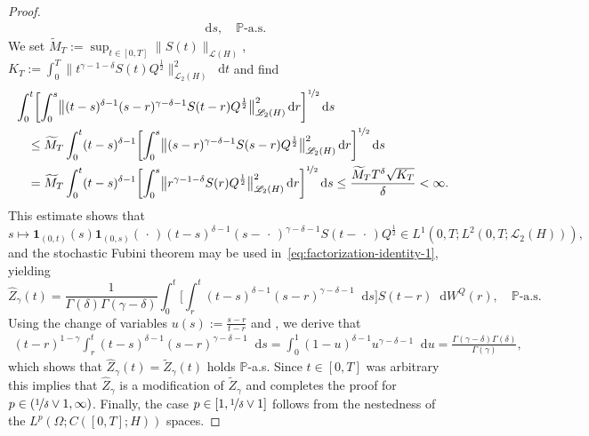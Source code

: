 \documentclass[reqno]{amsart}
\numberwithin{equation}{section}
\newcommand{\bbP}{\mathbb{P}}
\newcommand{\norm}[2]{     \| #1       \|_{ #2 }}
\newcommand{\rd}{\mathop{}\!\mathrm{d}}
\theoremstyle{remark}
\theoremstyle{definition}
\begin{document}
\begin{proof}
\begin{align}
	\rd s , 
	\quad 
	\bbP\text{-a.s.} 
	\label{eq:factorization-identity-1}
	\end{align}
	We set   
	$\widetilde M_T := \sup_{t\in[0,T]} \norm{S(t)}{\mathscr L(H)}$,  
	$K_T := \int_0^T 
	\bigl\| t^{\gamma-1-\delta} S(t) Q^{ \frac{1}{2} } \bigr\|_{\mathscr L_2(H)}^2 
	\rd t$
	and find 
	\begin{align*}
	&\int_0^t 
	\biggl[
	\int_0^s
	\bigl\| 
	(t-s)^{\delta-1} 
	(s-r)^{\gamma-\delta-1} S(t-r)Q^{\frac{1}{2}}
	\bigr\|_{\mathscr L_2(H)}^2
	\rd r
	\biggr]^{\nicefrac{1}{2}}
	\rd s 
	\\
	&\quad \leq 
	\widetilde M_T
	\int_0^t 
	(t-s)^{\delta-1}
	\biggl[
	\int_0^s
	\bigl\| 
	(s-r)^{\gamma-\delta-1} S(s-r)Q^{\frac{1}{2}}
	\bigr\|_{\mathscr L_2(H)}^2
	\rd r
	\biggr]^{\nicefrac{1}{2}}
	\rd s 
	\\
	&\quad
	=
	\widetilde M_T
	\int_0^t 
	(t-s)^{\delta-1}
	\biggl[
	\int_0^s
	\bigl\| 
	r^{\gamma-1-\delta} S(r)Q^{\frac{1}{2}}
	\bigr\|_{\mathscr L_2(H)}^2
	\rd r
	\biggr]^{\nicefrac{1}{2}}
	\rd s
	\leq 
	\frac{\widetilde M_T T^\delta \sqrt{ K_T } }{ \delta } < \infty.
	\end{align*}
	This estimate shows that 
	\[
	s\mapsto 
	\mathbf 1_{(0,t)}(s)
	\mathbf 1_{(0,s)}(\,\cdot\,)
	(t-s)^{\delta-1} 
	(s-\,\cdot\,)^{\gamma-\delta-1} 
	S(t-\,\cdot\,)Q^{\frac{1}{2}} 
	\in L^1(0,T;L^2(0,T;\mathscr L_2(H))) , 
	\] 
	and the stochastic Fubini theorem 
	\cite[Theorem~8.14]{Peszat_zabczyk_2007} 
	may be used
	in~\eqref{eq:factorization-identity-1}, yielding
	\[ 
	\widehat Z_{\gamma}(t)
	= 
	\frac{1}{\Gamma(\delta)\Gamma(\gamma-\delta)} 
	\int_0^t \biggl[\int_r^t
	(t-s)^{\delta-1} 
	(s-r)^{\gamma-\delta-1}  
	\rd s\biggr] S(t-r) \rd W^Q(r),
	\quad 
	\bbP\text{-a.s.} 
	\] 
	Using the change of variables $u(s) := \frac{s-r}{t-r}$
	and \cite[Formula~5.12.1]{Olver2010}, we derive that 
	\begin{align*}
	(t-r)^{1-\gamma}\int_r^t
	(t-s)^{\delta-1} 
	(s-r)^{\gamma-\delta-1}  
	\rd s
	=
	\int_0^1
	(1-u)^{\delta-1} 
	u^{\gamma-\delta-1}  
	\rd u
	=
	\frac{\Gamma(\gamma-\delta)\Gamma(\delta)}{\Gamma(\gamma)},
	\end{align*}
	which shows that 
	$\widehat{Z}_{\gamma}(t) = \widetilde{Z}_{\gamma}(t)$ 
	holds $\bbP$-a.s. 
	Since $t \in [0,T]$ was arbitrary this implies 
	that $\widehat{Z}_{\gamma}$ 
	is a modification of $\widetilde{Z}_{\gamma}$ 
	and completes the proof  
	for $p \in ( \nicefrac{1}{\delta} \vee 1,\infty)$. 
	Finally, the case $p\in [1, \nicefrac{1}{\delta} \vee 1 ]$ follows  
	from the nestedness of the $L^p(\Omega;C([0,T];H))$ spaces.
\end{proof}
\end{document}
